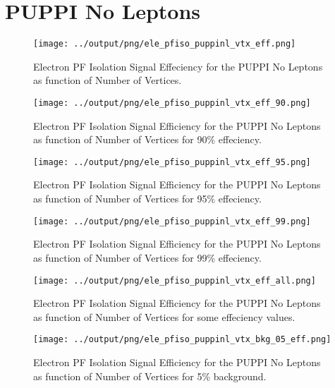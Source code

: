 \documentclass[11pt]{book}
\begin{document}
\section{PUPPI No Leptons}
\begin{figure}[htb]
\centering
\texttt{[image: ../output/png/ele\_pfiso\_puppinl\_vtx\_eff.png]}
\caption{Electron PF Isolation Signal Effeciency for the PUPPI No Leptons as function of Number of Vertices.}
\label{fig:ele_pfiso_vtx_eff_puppinl}
\end{figure}

\begin{figure}[htb]
\centering
\texttt{[image: ../output/png/ele\_pfiso\_puppinl\_vtx\_eff\_90.png]}
\caption{Electron PF Isolation Signal Efficiency for the PUPPI No Leptons as function of Number of Vertices for 90\% effeciency.}
\label{fig:ele_pfiso_vtx_eff_puppinl_eff_90}
\end{figure}

\begin{figure}[htb]
\centering
\texttt{[image: ../output/png/ele\_pfiso\_puppinl\_vtx\_eff\_95.png]}
\caption{Electron PF Isolation Signal Efficiency for the PUPPI No Leptons as function of Number of Vertices for 95\% effeciency.}
\label{fig:ele_pfiso_vtx_eff_puppinl_eff_95}
\end{figure}

\begin{figure}[htb]
\centering
\texttt{[image: ../output/png/ele\_pfiso\_puppinl\_vtx\_eff\_99.png]}
\caption{Electron PF Isolation Signal Efficiency for the PUPPI No Leptons as function of Number of Vertices for 99\% effeciency.}
\label{fig:ele_pfiso_vtx_eff_puppinl_eff_99}
\end{figure}

\begin{figure}[htb]
\centering
\texttt{[image: ../output/png/ele\_pfiso\_puppinl\_vtx\_eff\_all.png]}
\caption{Electron PF Isolation Signal Efficiency for the PUPPI No Leptons as function of Number of Vertices for some effeciency values.}
\label{fig:ele_pfiso_vtx_eff_puppinl_eff_all}
\end{figure}

\begin{figure}[htb]
\centering
\texttt{[image: ../output/png/ele\_pfiso\_puppinl\_vtx\_bkg\_05\_eff.png]}
\caption{Electron PF Isolation Signal Efficiency for the PUPPI No Leptons as function of Number of Vertices for 5\% background.}
\label{fig:ele_pfiso_vtx_eff_puppinl_bkg_05_eff}
\end{figure}
\end{document}
